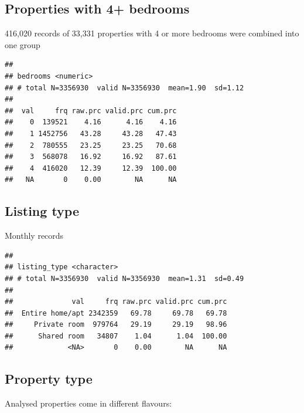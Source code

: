 \documentclass[]{article}
\begin{document}
\subsection{Properties with 4+
bedrooms}\label{properties-with-4-bedrooms}

416,020 records of 33,331 properties with 4 or more bedrooms were
combined into one group

\begin{verbatim}
## 
## bedrooms <numeric>
## # total N=3356930  valid N=3356930  mean=1.90  sd=1.12
## 
##  val     frq raw.prc valid.prc cum.prc
##    0  139521    4.16      4.16    4.16
##    1 1452756   43.28     43.28   47.43
##    2  780555   23.25     23.25   70.68
##    3  568078   16.92     16.92   87.61
##    4  416020   12.39     12.39  100.00
##   NA       0    0.00        NA      NA
\end{verbatim}

\subsection{Listing type}\label{listing-type}

Monthly records

\begin{verbatim}
## 
## listing_type <character>
## # total N=3356930  valid N=3356930  mean=1.31  sd=0.49
## 
##              val     frq raw.prc valid.prc cum.prc
##  Entire home/apt 2342359   69.78     69.78   69.78
##     Private room  979764   29.19     29.19   98.96
##      Shared room   34807    1.04      1.04  100.00
##             <NA>       0    0.00        NA      NA
\end{verbatim}

\subsection{Property type}\label{property-type}

Analysed properties come in different flavours:
\end{document}
